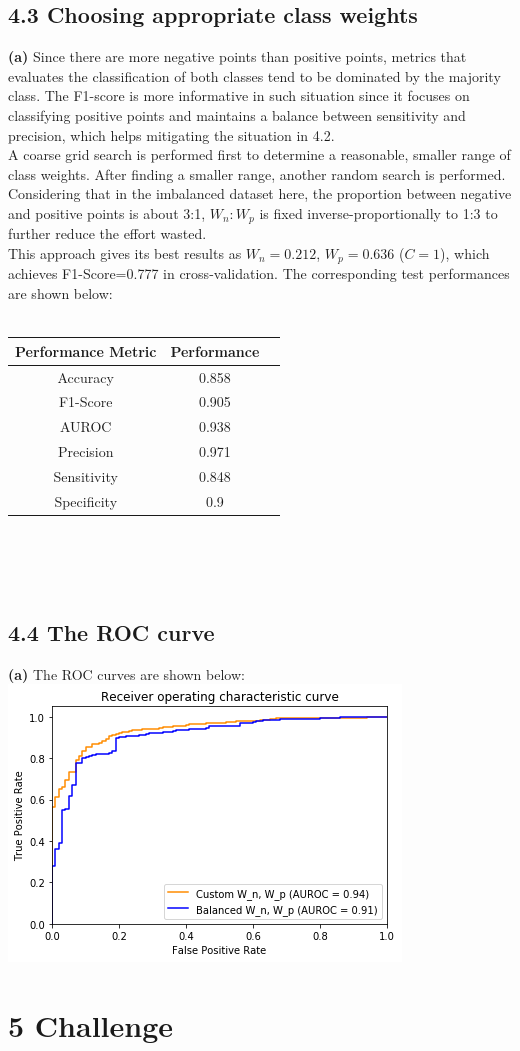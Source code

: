 \documentclass{article}
\begin{document}
\subsection*{4.3 Choosing appropriate class weights}
\textbf{(a)} Since there are more negative points than positive points, metrics that evaluates the classification of both classes tend to be dominated by the majority class. The F1-score is more informative in such situation since it focuses on
classifying positive points and maintains a balance between sensitivity and precision,
which helps mitigating the situation in 4.2. \\
\indent A coarse grid search is performed first to determine a reasonable, smaller range of class weights.
After finding a smaller range, another random search is performed. Considering that in the imbalanced dataset here,
the proportion between negative and positive points is about 3:1, $W_n:W_p$ is fixed inverse-proportionally to 1:3
to further reduce the effort wasted. \\
\indent This approach gives its best results as $W_n=0.212$, $W_p=0.636$ ($C=1$),
which achieves F1-Score=0.777 in cross-validation. The corresponding test performances are shown below: \\\\
\begin{tabular}{|c|c|c|}
\hline
\bf Performance Metric & \bf Performance \\ \hline
Accuracy &  0.858 \\ \hline
F1-Score &  0.905 \\ \hline
AUROC &  0.938 \\ \hline
Precision &  0.971 \\ \hline
Sensitivity &  0.848 \\ \hline
Specificity &  0.9 \\ \hline
\end{tabular}\\ \\\\
\subsection*{4.4 The ROC curve}
\textbf{(a)} The ROC curves are shown below:\\
\includegraphics[width=.5\textwidth]{44.png}\\
\section*{5 Challenge}
\end{document}
